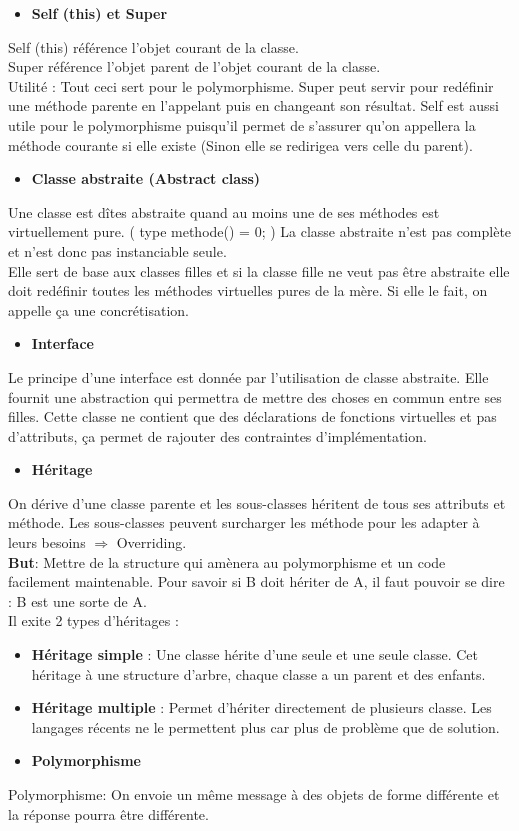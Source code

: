 \begin{itemize}
	\item \textbf{Self (this) et Super}
\end{itemize}
\color[rgb]{0,0.48,0.58}
Self (this) référence l'objet courant de la classe.
\\Super référence l'objet parent de l'objet courant de la classe.
\\Utilité : Tout ceci sert pour le polymorphisme. Super peut servir pour redéfinir une méthode parente en l'appelant puis en changeant son résultat. Self est aussi utile pour le polymorphisme puisqu'il permet de s'assurer qu'on appellera la méthode courante si elle existe (Sinon elle se redirigea vers celle du parent).
\color[rgb]{0,0,0}

\begin{itemize}
	\item \textbf{Classe abstraite (Abstract class)}
\end{itemize}
\color[rgb]{0,0.48,0.58}
Une classe est dîtes abstraite quand au moins une de ses méthodes est virtuellement pure. ( type methode() = 0; ) La classe abstraite n'est pas complète et n'est donc pas instanciable seule.
\\Elle sert de base aux classes filles et si la classe fille ne veut pas être abstraite elle doit redéfinir toutes les méthodes virtuelles pures de la mère. Si elle le fait, on appelle ça une concrétisation.
\color[rgb]{0,0,0}


\begin{itemize}
	\item \textbf{Interface}
\end{itemize}
\color[rgb]{0,0.48,0.58}
Le principe d'une interface est donnée par l'utilisation de classe abstraite. Elle fournit une abstraction qui permettra de mettre des choses en commun entre ses filles. Cette classe ne contient que des déclarations de fonctions virtuelles et pas d’attributs, ça permet de rajouter des contraintes d’implémentation.
\color[rgb]{0,0,0}

\begin{itemize}
	\item \textbf{Héritage}
\end{itemize}
\color[rgb]{0,0.48,0.58}
On dérive d’une classe parente et les sous-classes héritent de tous ses attributs et méthode.
Les sous-classes peuvent surcharger les méthode pour les adapter à leurs besoins $\Rightarrow$ Overriding.
\\\textbf{But}: Mettre de la structure qui amènera au polymorphisme et un code facilement maintenable.
Pour savoir si B doit hériter de A, il faut pouvoir se dire : B est une sorte de A.
\\Il exite 2 types d'héritages :
\begin{itemize}
	\item \textbf{Héritage simple} : Une classe hérite d’une seule et une seule classe. Cet héritage à une structure d’arbre, chaque classe a un parent et des enfants.
	\item \textbf{Héritage multiple} : Permet d’hériter directement de plusieurs classe. Les langages récents ne le permettent plus car plus de problème que de solution.
\end{itemize}
\color[rgb]{0,0,0}

\begin{itemize}
	\item \textbf{Polymorphisme}
\end{itemize}
\textcolor[rgb]{0,0.48,0.58}{Polymorphisme: On envoie un même message à des objets de forme différente et la réponse pourra être différente.}